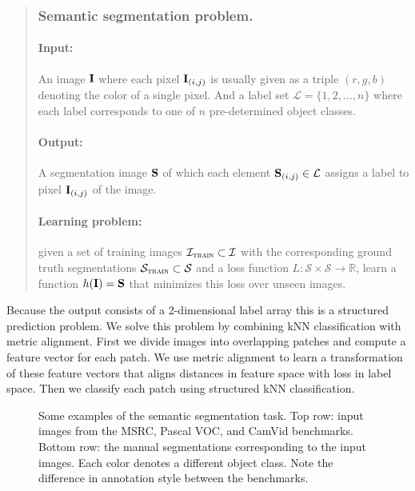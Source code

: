 \begin{quotation}
\subsubsection*{Semantic segmentation problem.}

\paragraph{Input:} An image $\mathbf{I}$ where each pixel $\mathbf{I}_{(i,j)}$ is usually given as a triple $(r,g,b)$ denoting the color of a single pixel. And a label set $\mathcal{L} = \{1, 2, \ldots, n\}$ where each label corresponds to one of $n$ pre-determined object classes.

\paragraph{Output:} A segmentation image $\mathbf{S}$ of which each element  $\mathbf{S}_{(i,j)} \in \mathcal{L}$ assigns a label to pixel $\mathbf{I}_{(i,j)}$ of the image.

\paragraph{Learning problem:} given a set of training images $\mathcal{I}_\textsc{train} \subset \mathcal{I}$ with the corresponding ground truth segmentations $\mathcal{S}_\textsc{train} \subset \mathcal{S}$ and a loss function $L: \mathcal{S} \times \mathcal{S} \rightarrow \mathbb{R}$, learn a function $h(\mathbf{I}) = \mathbf{S}$ that minimizes this loss over unseen images. %
\end{quotation}


Because the output consists of a 2-dimensional label array this is a structured prediction problem. We solve this problem by combining \ac{kNN} classification with metric alignment. First we divide images into overlapping patches and compute a feature vector for each patch. We use metric alignment to learn a transformation of these feature vectors that aligns distances in feature space with loss in label space. Then we classify each patch using structured \ac{kNN} classification.

\begin{figure}[tbh]
\begin{center}
\caption{Some examples of the semantic segmentation task. Top row: input images from the MSRC, Pascal VOC, and CamVid benchmarks. Bottom row: the manual segmentations corresponding to the input images. Each color denotes a different object class. Note the difference in annotation style between the benchmarks.}
\label{fig:segmentation_examples}
\end{center}
\end{figure}

